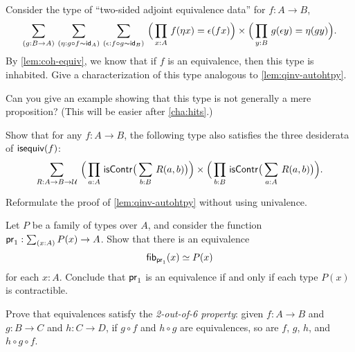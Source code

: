 \sectionExercises

\begin{ex}
  Consider the type of ``two-sided adjoint equivalence data'' for $f:A\to B$,
  \begin{equation*}
    \sm{g:B\to A}{\eta: g \circ f \sim \idfunc[A]}{\epsilon:f \circ g \sim \idfunc[B]}
    \Big(\prd{x:A} \map{f}{\eta x} = \epsilon(fx)\Big) \times
    \Big(\prd{y:B} \map{g}{\epsilon y} = \eta(gy) \Big).
  \end{equation*}
  By \autoref{lem:coh-equiv}, we know that if $f$ is an equivalence, then this type is inhabited.
  Give a characterization of this type analogous to \autoref{lem:qinv-autohtpy}.

  Can you give an example showing that this type is not generally a mere proposition?
  (This will be easier after \autoref{cha:hits}.)
\end{ex}

\begin{ex}
  Show that for any $f:A\to B$, the following type also satisfies the three desiderata of $\mathsf{isequiv}(f)$:
  \begin{equation*}
    \sm{R:A\to B\to \type}
    \Big(\prd{a:A} \iscontr\big(\sm{b:B} R(a,b)\big)\Big) \times
    \Big(\prd{b:B} \iscontr\big(\sm{a:A} R(a,b)\big)\Big).
  \end{equation*}
\end{ex}

\begin{ex}
  Reformulate the proof of \autoref{lem:qinv-autohtpy} without using univalence.
\end{ex}

\begin{ex}\label{ex:projoftotaloffamcontrisequiv}
  Let $P$ be a family of types over $A$, and consider the function
  $\proj{1}:\sm{x:A}P(x)\to A$. Show that there is an equivalence
  \begin{equation*}
    {\mathsf{fib}}_{\mathsf{pr}_{1}}(x) \simeq P(x)
  \end{equation*}
  for each $x:A$.
  Conclude that $\mathsf{pr}_{1}$ is an equivalence if and only if each type $P(x)$ is contractible.
\end{ex}

\begin{ex}
  Prove that equivalences satisfy the \emph{2-out-of-6 property}: given $f:A\to B$ and $g:B\to C$ and $h:C\to D$, if $g\circ f$ and $h\circ g$ are equivalences, so are $f$, $g$, $h$, and $h\circ g\circ f$.
\end{ex}

